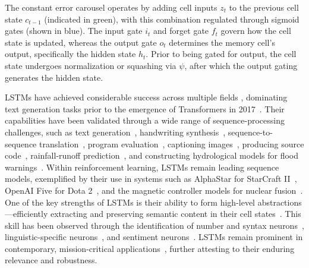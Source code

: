 The constant error carousel operates by adding cell inputs $z_t$ to the previous cell state $c_{t-1}$ (indicated in green), with this combination regulated through sigmoid gates (shown in blue). The input gate $i_t$ and forget gate $f_t$ govern how the cell state is updated, whereas the output gate $o_t$ determines the memory cell’s output, specifically the hidden state $h_t$. Prior to being gated for output, the cell state undergoes normalization or squashing via $\psi$, after which the output gating generates the hidden state.

LSTMs have achieved considerable success across multiple fields \citep{Hochreiter:01,Hochreiter:07,Schmidhuber:15}, dominating text generation tasks prior to the emergence of Transformers in 2017~\citep{Vaswani:17}. Their capabilities have been validated through a wide range of sequence-processing challenges, such as text generation~\citep{Graves:13,Karpathy:15blog}, handwriting synthesis~\citep{Graves:13}, sequence-to-sequence translation~\citep{Sutskever:14nips}, program evaluation~\citep{Zaremba:14arxiv}, captioning images~\citep{Karpathy:15,Hossain:19}, producing source code~\citep{Karpathy:15blog}, rainfall-runoff prediction~\citep{Kratzert:18,Kratzert:19}, and constructing hydrological models for flood warnings~\citep{Nearing:24}. Within reinforcement learning, LSTMs remain leading sequence models, exemplified by their use in systems such as AlphaStar for StarCraft II~\citep{Vinyals:17short}, OpenAI Five for Dota 2~\citep{OpenAI:19}, and the magnetic controller models for nuclear fusion~\citep{Degrave:22short}. One of the key strengths of LSTMs is their ability to form high-level abstractions—efficiently extracting and preserving semantic content in their cell states~\citep{Karpathy:15blog}. This skill has been observed through the identification of number and syntax neurons~\citep{Lakretz:19}, linguistic-specific neurons~\citep{Bau:19}, and sentiment neurons~\citep{Radford:17arxiv}. LSTMs remain prominent in contemporary, mission-critical applications~\citep{Degrave:22short,Nearing:24}, further attesting to their enduring relevance and robustness.

